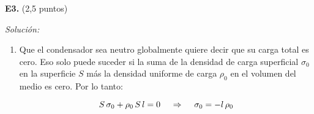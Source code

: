 \textbf{E3.} (2,5 puntos)


\vspace{20px}
\textit{Solución:}
\\

\begin{enumerate}
[label=\alph*)]
    \item Que el condensador sea neutro globalmente quiere decir que su carga total es cero. Eso solo puede suceder si la suma de la densidad de carga superficial
    $\sigma_0$ en la superficie $S$ más la densidad uniforme de carga $\rho_0$ en el volumen del medio es cero. Por lo tanto:

    \begin{equation*}
        S \, \sigma_0 + \rho_0 \, S \, l = 0 \hspace{12px} \Rightarrow \hspace{12px} \sigma_0 = - l \, \rho_0
    \end{equation*}


\end{enumerate}